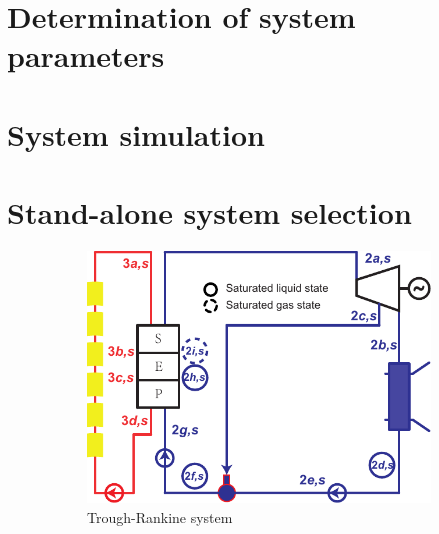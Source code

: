 \section{Determination of system parameters}

\section{System simulation}

\section{Stand-alone system selection}

\noindent \begin{figure}[htbp]
\centering
	\begin{subfigure}[b]{0.63\columnwidth}
	\includegraphics[width = \columnwidth]{fig/Trough-s}
	\caption{Trough-Rankine system}\label{fig:TroughRankine}
	\end{subfigure}
	~
\begin{subfigure}[b]{0.266\columnwidth}

\end{subfigure}
\end{figure}
